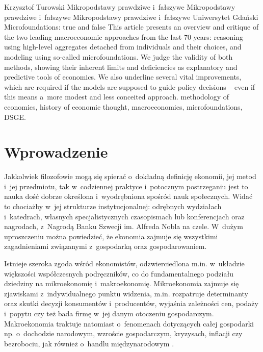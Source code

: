 \begin{artplenv}{Krzysztof Turowski}
	{Mikropodstawy prawdziwe i~fałszywe}
	{Mikropodstawy prawdziwe i~fałszywe}
	{Mikropodstawy prawdziwe i~fałszywe}
	{Uniwersytet Gdański}
	{Microfoundations: true and false}
	{This article presents an overview and critique of the two leading macroeconomic approaches from the last 70 years:
		reasoning using high-level aggregates detached from individuals and their choices, and modeling using so-called
		microfoundations. We judge the validity of both methods, showing their inherent limits and deficiencies as explanatory
		and predictive tools of economics. We also underline several vital improvements, which are required if the models are
		supposed to guide policy decisions -- even if this means a~more modest and less conceited approach.}
	{methodology of economics, history of economic thought, macroeconomics, microfoundations, DSGE.}



\section*{Wprowadzenie}
\lettrine[loversize=0.13,lines=2,lraise=-0.05,nindent=0em,findent=0.2pt]%
{J}{}akkolwiek filozofowie mogą się spierać o~dokładną definicję ekonomii, jej metod i~jej przedmiotu, tak w~codziennej
praktyce i~potocznym postrzeganiu jest to nauka dość dobrze określona i~wyodrębniona spośród nauk społecznych. Widać to
chociażby w~jej strukturze instytucjonalnej: odrębnych wydziałach i~katedrach, własnych specjalistycznych czasopismach
lub konferencjach oraz nagrodach, z~Nagrodą Banku Szwecji im. Alfreda Nobla na czele. W~dużym uproszczeniu można
powiedzieć, że ekonomia zajmuje się wszystkimi zagadnieniami związanymi z~gospodarką oraz gospodarowaniem.

Istnieje szeroka zgoda wśród ekonomistów, odzwierciedlona m.in. w~układzie większości współczesnych podręczników, co do
fundamentalnego podziału dziedziny na mikroekonomię i~makroekonomię. Mikroekonomia zajmuje się
zjawiskami z~indywidualnego punktu widzenia, m.in. rozpatruje determinanty oraz skutki decyzji konsumentów i~producentów, wyjaśnia
zależności cen, podaży i~popytu czy też bada firmę w~jej danym otoczeniu gospodarczym. Makroekonomia traktuje natomiast
o~fenomenach dotyczących całej gospodarki np. o~dochodzie narodowym, wzroście gospodarczym, kryzysach, inflacji czy
bezrobociu, jak również o~handlu międzynarodowym
\parencite{samuelson_ekonomia_2003}.


\end{artplenv}
